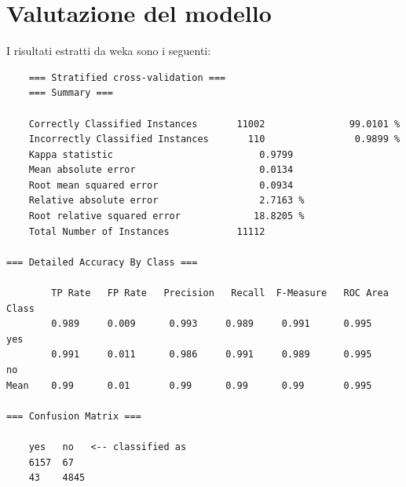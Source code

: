 \section{Valutazione del modello}
\label{Risultati}
I risultati estratti da weka sono i seguenti: 
{\footnotesize
\begin{verbatim}
	=== Stratified cross-validation ===
	=== Summary ===
	
	Correctly Classified Instances       11002               99.0101 %
	Incorrectly Classified Instances       110                0.9899 %
	Kappa statistic                          0.9799
	Mean absolute error                      0.0134
	Root mean squared error                  0.0934
	Relative absolute error                  2.7163 %
	Root relative squared error             18.8205 %
	Total Number of Instances            11112     
	
=== Detailed Accuracy By Class ===
	
        TP Rate   FP Rate   Precision   Recall  F-Measure   ROC Area  Class
        0.989     0.009      0.993     0.989     0.991      0.995      yes
        0.991     0.011      0.986     0.991     0.989      0.995      no
Mean    0.99      0.01       0.99      0.99      0.99       0.995
	
=== Confusion Matrix ===
	
    yes   no   <-- classified as
    6157  67 
    43    4845
	
\end{verbatim}
}

